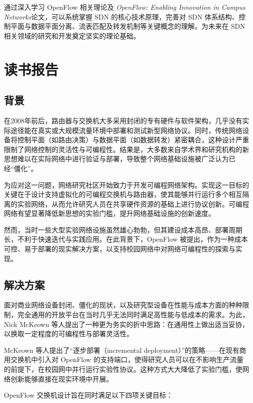 \documentclass{article}
\begin{document}
通过深入学习 OpenFlow 相关理论及 \textit{OpenFlow: Enabling Innovation in Campus Networks}论文，可以系统掌握 SDN 的核心技术原理，完善对 SDN 体系结构、控制平面与数据平面分离、流表匹配及转发机制等关键概念的理解。为未来在 SDN 相关领域的研究和开发奠定坚实的理论基础。


\section{读书报告}

\subsection{\textbf{背景}}

\quad\quad  在2008年前后，路由器与交换机大多采用封闭的专有硬件与软件架构，几乎没有实际途径能在真实或大规模流量环境中部署和测试新型网络协议。同时，传统网络设备将控制平面（如路由决策）与数据平面（如数据转发）紧密耦合，这种设计严重限制了网络控制的灵活性与可编程性。结果是，大多数来自学术界和研究机构的新思想难以在实际网络中进行验证与部署，导致整个网络基础设施被广泛认为已经“僵化”。

为应对这一问题，网络研究社区开始致力于开发可编程网络架构。实现这一目标的关键在于设计支持虚拟化的可编程交换机与路由器，使其能够并行运行多个相互隔离的实验网络，从而允许研究人员在共享硬件资源的基础上进行协议创新。可编程网络有望显著降低新思想的实验门槛，提升网络基础设施的创新速度。

然而，当时一些大型实验网络设施虽然雄心勃勃，但其建设成本高昂、部署周期长，不利于快速迭代与实践应用。在此背景下，OpenFlow 被提出，作为一种成本可控、易于部署的现实解决方案，以支持校园网络中对网络可编程性的探索与实现。


\subsection{\textbf{解决方案}}


\quad\quad  面对商业网络设备封闭、僵化的现状，以及研究型设备在性能与成本方面的种种限制，完全通用的开放平台在当时几乎无法同时满足高性能与低成本的需求。为此，Nick McKeown 等人提出了一种更为务实的折中思路：在通用性上做出适当妥协，以换取一定程度的可编程性与部署灵活性。

McKeown 等人提出了“逐步部署（incremental deployment）”的策略——在现有商用交换机中引入对 OpenFlow 的支持端口，使得研究人员可以在不影响生产流量的前提下，在校园网中并行运行实验性协议。这种方式大大降低了实验门槛，使网络创新能够直接在现实环境中开展。

OpenFlow 交换机设计旨在同时满足以下四项关键目标\cite{bolg}：
\end{document}
